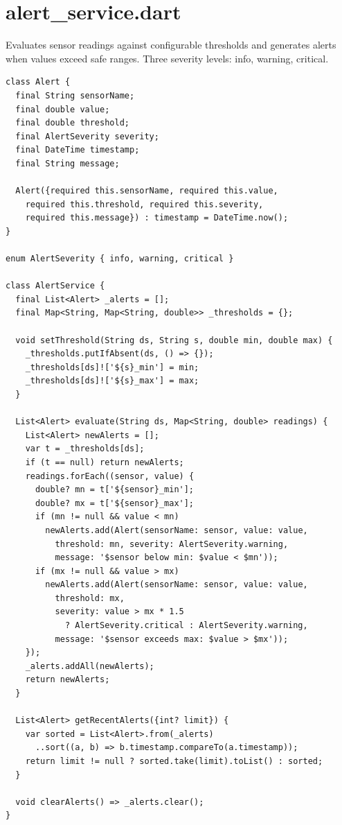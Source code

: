 \documentclass[12pt,a4paper,oneside]{report}
\begin{document}
\section{alert\_service.dart}

Evaluates sensor readings against configurable thresholds and generates alerts when values exceed safe ranges. Three severity levels: info, warning, critical.

\begin{lstlisting}[style=dartstyle]
class Alert {
  final String sensorName;
  final double value;
  final double threshold;
  final AlertSeverity severity;
  final DateTime timestamp;
  final String message;

  Alert({required this.sensorName, required this.value,
    required this.threshold, required this.severity,
    required this.message}) : timestamp = DateTime.now();
}

enum AlertSeverity { info, warning, critical }

class AlertService {
  final List<Alert> _alerts = [];
  final Map<String, Map<String, double>> _thresholds = {};

  void setThreshold(String ds, String s, double min, double max) {
    _thresholds.putIfAbsent(ds, () => {});
    _thresholds[ds]!['${s}_min'] = min;
    _thresholds[ds]!['${s}_max'] = max;
  }

  List<Alert> evaluate(String ds, Map<String, double> readings) {
    List<Alert> newAlerts = [];
    var t = _thresholds[ds];
    if (t == null) return newAlerts;
    readings.forEach((sensor, value) {
      double? mn = t['${sensor}_min'];
      double? mx = t['${sensor}_max'];
      if (mn != null && value < mn)
        newAlerts.add(Alert(sensorName: sensor, value: value,
          threshold: mn, severity: AlertSeverity.warning,
          message: '$sensor below min: $value < $mn'));
      if (mx != null && value > mx)
        newAlerts.add(Alert(sensorName: sensor, value: value,
          threshold: mx,
          severity: value > mx * 1.5
            ? AlertSeverity.critical : AlertSeverity.warning,
          message: '$sensor exceeds max: $value > $mx'));
    });
    _alerts.addAll(newAlerts);
    return newAlerts;
  }

  List<Alert> getRecentAlerts({int? limit}) {
    var sorted = List<Alert>.from(_alerts)
      ..sort((a, b) => b.timestamp.compareTo(a.timestamp));
    return limit != null ? sorted.take(limit).toList() : sorted;
  }

  void clearAlerts() => _alerts.clear();
}
\end{lstlisting}
\end{document}
